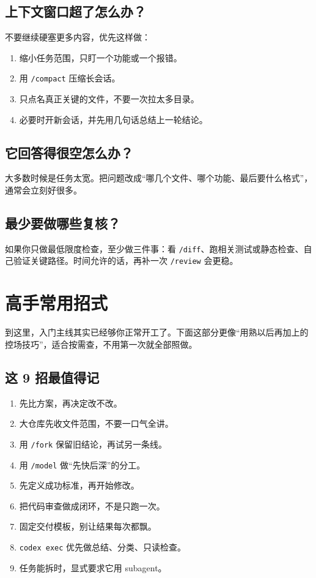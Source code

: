 \documentclass[UTF8,a4paper,11pt]{ctexart}
\begin{document}
\subsection{上下文窗口超了怎么办？}

不要继续硬塞更多内容，优先这样做：
\begin{enumerate}
  \item 缩小任务范围，只盯一个功能或一个报错。
  \item 用 \texttt{/compact} 压缩长会话。
  \item 只点名真正关键的文件，不要一次拉太多目录。
  \item 必要时开新会话，并先用几句话总结上一轮结论。
\end{enumerate}

\subsection{它回答得很空怎么办？}

大多数时候是任务太宽。把问题改成“哪几个文件、哪个功能、最后要什么格式”，通常会立刻好很多。

\subsection{最少要做哪些复核？}

如果你只做最低限度检查，至少做三件事：看 \texttt{/diff}、跑相关测试或静态检查、自己验证关键路径。时间允许的话，再补一次 \texttt{/review} 会更稳。

\section{高手常用招式}

到这里，入门主线其实已经够你正常开工了。下面这部分更像“用熟以后再加上的控场技巧”，适合按需查，不用第一次就全部照做。

\subsection{这 9 招最值得记}

\begin{enumerate}
  \item 先比方案，再决定改不改。
  \item 大仓库先收文件范围，不要一口气全讲。
  \item 用 \texttt{/fork} 保留旧结论，再试另一条线。
  \item 用 \texttt{/model} 做“先快后深”的分工。
  \item 先定义成功标准，再开始修改。
  \item 把代码审查做成闭环，不是只跑一次。
  \item 固定交付模板，别让结果每次都飘。
  \item \texttt{codex exec} 优先做总结、分类、只读检查。
  \item 任务能拆时，显式要求它用 subagent。
\end{enumerate}
\end{document}
